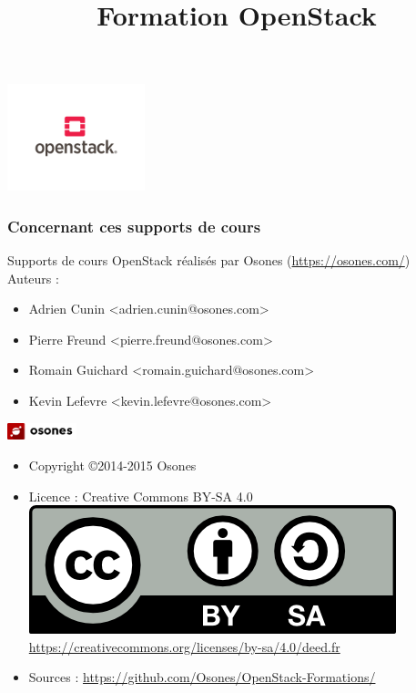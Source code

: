 \usepackage{graphicx}
\usepackage{xparse}
\usepackage{microtype}
\usepackage{verbatim}


\title{Formation OpenStack}



  \begin{frame}
    \titlepage
    \begin{center}
      \includegraphics[width=4cm]{images/openstack.png}
    \end{center}
  \end{frame}

  \begin{frame}
    \frametitle{Concernant ces supports de cours}
    Supports de cours OpenStack réalisés par Osones (\url{https://osones.com/})\\
    Auteurs :
    \begin{itemize}
      \item Adrien Cunin \textless adrien.cunin@osones.com\textgreater
      \item Pierre Freund \textless pierre.freund@osones.com\textgreater
      \item Romain Guichard \textless romain.guichard@osones.com\textgreater
      \item Kevin Lefevre \textless kevin.lefevre@osones.com\textgreater
    \end{itemize}
    \begin{center}
      \includegraphics[height=0.5cm]{images/logo-osones.png}
    \end{center}
    \begin{itemize}
      \item Copyright \copyright{2014-2015 Osones}
      \item Licence : Creative Commons BY-SA 4.0 \\
        \includegraphics{images/licence.png} \\
        \url{https://creativecommons.org/licenses/by-sa/4.0/deed.fr}
      \item Sources : \url{https://github.com/Osones/OpenStack-Formations/}
    \end{itemize}
  \end{frame}

